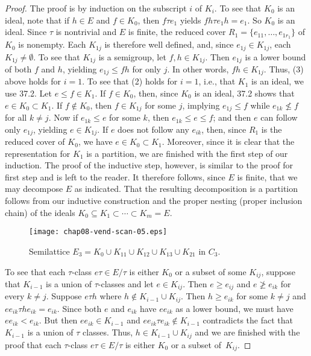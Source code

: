 \documentclass{surv-l}
\numberwithin{equation}{section}
\numberwithin{table}{section}
\numberwithin{figure}{section}
\theoremstyle{plain}
\theoremstyle{definition}
\begin{document}
\begin{proof} The proof is by induction on the subscript $i$ of $K_{i}$.
To see that $K_{0}$ is an ideal, note that if $h\in E$ and $f\in
K_{0}$, then $f\tau e_{1}$ yields $fh\tau e_{1}h=e_{1}$. So
$K_{0}$ is an ideal. Since $\tau$ is nontrivial and $E$ is finite,
the reduced cover $R_{1}= \{e_{11},\ldots, e_{1r_{1}}\}$ of
$K_{0}$ is nonempty. Each $K_{1j}$ is therefore well defined, and,
since $e_{1j}\in K_{1j}$, each $K_{1j}\neq\emptyset$. To see that
$K_{1j}$ is a semigroup, let $f, h\in K_{1j}$. Then $e_{1j}$ is a
lower bound of both $f$ and $h$, yielding $e_{1j}\leq fh$ for only
$j$. In other words, $fh\in K_{1j}$. Thus, (3) above holds for
$i=1$. To see that (2) holds for $i=1$, i.e., that $K_{1}$ is an
ideal, we use 37.2. Let $e\leq f\in K_{1}$. If $f\in K_{0}$, then,
since $K_{0}$ is an ideal, 37.2 shows that $e\in K_{0}\subset
K_{1}$. If $f\not\in K_{0}$, then $f\in K_{1j}$ for some $j$,
implying $e_{1j}\leq f$ while $e_{1k}\not\leq f$ for all $k\neq
j$. Now if $e_{1k}\leq e$ for some $k$, then $e_{1k}\leq e\leq f$;
and then $e$ can follow only $e_{1j}$, yielding $e\in K_{1j}$. If
$e$ does not follow any $e_{ik}$, then, since $R_{1}$ is the
reduced cover of $K_{0}$, we have $e\in K_{0}\subset K_{1}$.
Moreover, since it is clear that the representation for $K_{1}$ is
a partition, we are finished with the first step of our induction.
The proof of the inductive step, however, is similar to the proof
for first step and is left to the reader. It therefore follows,
since $E$ is finite, that we may decompose $E$ as indicated. That
the resulting decomposition is a partition follows from our
inductive construction and the proper nesting (proper inclusion
chain) of the ideals $K_{0}\subseteq K_{1}\subset\cdots\subset K_{m}=E$.

\setcounter{figure}{3}
\begin{figure}[!h]
\texttt{[image: chap08-vend-scan-05.eps]}
\caption{Semilattice $E_{3}=K_{0}\cup K_{11}\cup K_{12}\cup K_{13}\cup
K_{21}$ in $C_{3}$.}\label{fig8.37.4}
\end{figure}

To see that each $\tau$-class $e\tau\in E/\tau$ is either $K_{0}$
or a subset of some $K_{ij}$, suppose that $K_{i-1}$ is a union of
$\tau$-classes and let $e\in K_{ij}$. Then $e\geq e_{ij}$ and
$e\not\geq e_{ik}$ for every $k\neq j$. Suppose $e\tau h$ where
$h\not\in K_{i-1}\cup K_{ij}$. Then $h\geq e_{ik}$ for some $k\neq
j$ and $ee_{ik}\tau he_{ik}=e_{ik}$. Since both $e$ and $e_{ik}$
have $ee_{ik}$ as a lower bound, we must have $ee_{ik}<e_{ik}$.
But then $ee_{ik}\in K_{i-1}$ and $ee_{ik}\tau e_{ik}\not\in
K_{i-1}$ contradicts the fact that $K_{i-1}$ is a union of $\tau$
classes. Thus, $h\in K_{i-1}\cup K_{ij}$ and we are finished with
the proof that each $\tau$-class $ e\tau\in E/\tau$ is either
$K_{0}$ or a subset of~$K_{ij}$.


\end{proof}
\end{document}

